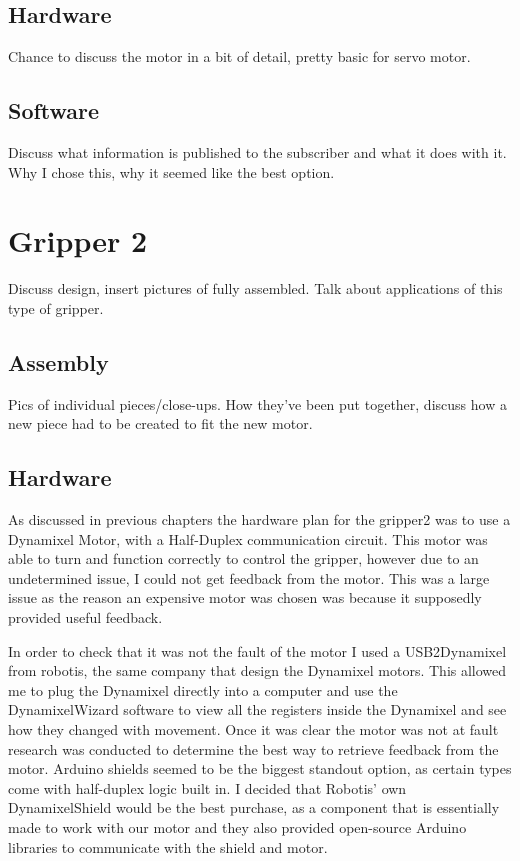 \documentclass{l4proj}
\begin{document}
\subsection{Hardware}
Chance to discuss the motor in a bit of detail, pretty basic for servo motor. 
\subsection{Software}
Discuss what information is published to the subscriber and what it does with it. Why I chose this, why it seemed like the best option. 

\section{Gripper 2}
Discuss design, insert pictures of fully assembled. Talk about applications of this type of gripper.
\subsection{Assembly}
Pics of individual pieces/close-ups. How they've been put together, discuss how a new piece had to be created to fit the new motor.

\subsection{Hardware}
As discussed in previous chapters the hardware plan for the gripper2 was to use a Dynamixel Motor, with a Half-Duplex communication circuit. This motor was able to turn and function correctly to control the gripper, however due to an undetermined issue, I could not get feedback from the motor. This was a large issue as the reason an expensive motor was chosen was because it supposedly provided useful feedback. 

In order to check that it was not the fault of the motor I used a USB2Dynamixel from robotis, the same company that design the Dynamixel motors. This allowed me to plug the Dynamixel directly into a computer and use the DynamixelWizard software to view all the registers inside the Dynamixel and see how they changed with movement. Once it was clear the motor was not at fault research was conducted to determine the best way to retrieve feedback from the motor. Arduino shields seemed to be the biggest standout option, as certain types come with half-duplex logic built in. I decided that Robotis' own DynamixelShield would be the best purchase, as a component that is essentially made to work with our motor and they also provided open-source Arduino libraries to communicate with the shield and motor. 
\end{document}
